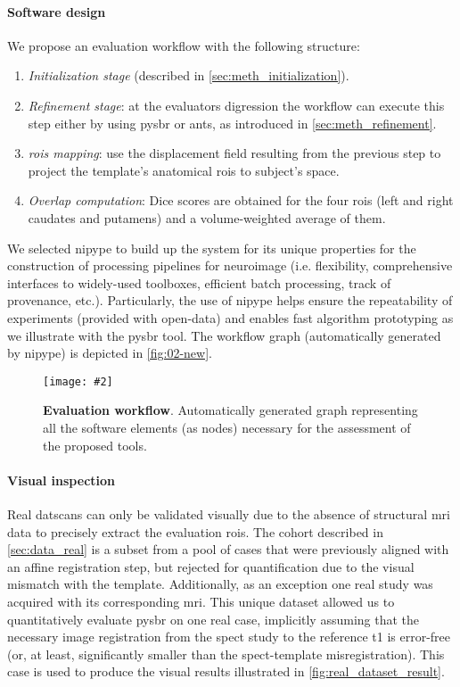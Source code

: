 \documentclass{frontiers}
\newcommand{\insertgraphic}[2]{\texttt{[image: \#2]}}
\newcommand{\insertgraphic}[2]{\texttt{[image: \#2]}}
\newcommand{\emitem}[1]{\item \emph{#1}}
\begin{document}
\paragraph{Software design}\label{sec:workflow}
We propose an evaluation workflow with the following structure:
\begin{enumerate}
\emitem{Initialization stage} (described in \autoref{sec:meth_initialization}).
\emitem{Refinement stage}: at the evaluators digression the workflow can execute 
  this step either by using \gls*{pysbr} or \gls*{ants}, as
  introduced in \autoref{sec:meth_refinement}.
\emitem{\Glspl{roi} mapping}: use the displacement field resulting from
  the previous step to project the template's anatomical \glspl*{roi} to
  subject's space.
\emitem{Overlap computation}: Dice scores are obtained for the four
  \glspl*{roi} (left and right caudates and putamens) and a
  volume-weighted average of them.
\end{enumerate}
We selected \gls*{nipype} to build up the system for its unique properties for
  the construction of processing pipelines for neuroimage (i.e. flexibility,
  comprehensive interfaces to widely-used toolboxes, efficient batch processing,
  track of provenance, etc.).
Particularly, the use of \gls*{nipype} helps ensure the repeatability of
  experiments (provided with open-data) and enables fast algorithm prototyping
  as we illustrate with the \gls*{pysbr} tool.
The workflow graph (automatically generated by \gls*{nipype}) is depicted in 
  \autoref{fig:02-new}.

\begin{figure*}[!ht]
  \centering
    \insertgraphic{width=\linewidth}{figures/04-nipype-workflow}
  \caption{\label{fig:02-new}
  \textbf{Evaluation workflow}. Automatically generated graph 
  representing all the software elements (as nodes) necessary
  for the assessment of the proposed tools.}
\end{figure*}


\paragraph{Visual inspection} %
Real \glspl*{datscan} can only be validated visually due to the 
  absence of structural \gls*{mri} data to precisely extract
  the evaluation \glspl*{roi}.
The cohort described in \autoref{sec:data_real}
  is a subset from a pool of cases that were previously aligned with an
  affine registration step, but rejected for quantification due to the
  visual mismatch with the template.
Additionally, as an exception one real study was acquired with its
  corresponding \gls*{mri}.
This unique dataset allowed us to quantitatively evaluate \gls*{pysbr} on one real case,
  implicitly assuming that the necessary image registration from the 
  \gls*{spect} study to the reference \gls*{t1} is error-free 
  (or, at least, significantly smaller than the \gls*{spect}-template misregistration).
This case is used to produce the visual results illustrated in
  \autoref{fig:real_dataset_result}.
\end{document}
